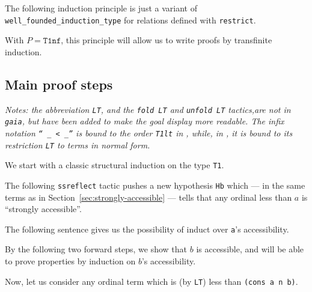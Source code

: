 
The following induction principle is just a variant of \texttt{well\_founded\_induction\_type} for relations defined with \texttt{restrict}.


With $P=\texttt{T1nf}$, this principle will allow us to write proofs by transfinite induction.

\subsection{Main proof steps}

\emph{Notes: the abbreviation \texttt{LT}, and the \texttt{fold LT} and \texttt{unfold LT} tactics,are not in \texttt{gaia}, but  have been added to make the goal display more readable.
The infix notation \texttt{`` \_ < \_''}  is bound to the order \texttt{T1lt} in \gaia, while,  in \Hydras,  it is bound to its restriction \texttt{LT} to terms in normal form. }

We start with a classic structural induction on the type \texttt{T1}.

The following \texttt{ssreflect} tactic  pushes a new hypothesis \texttt{Hb} which --- in the same terms as in Section~\vref{sec:strongly-accessible} --- tells that any ordinal less than $a$ is ``strongly accessible''.


The following sentence gives us the possibility of induct over \texttt{a}'s accessibility.



By the following two forward steps, we show that $b$ is accessible, and will be able to prove properties by induction on $b$'s accessibility.




Now, let us consider any ordinal term which is (by \texttt{LT}) less than \texttt{(cons a n b)}.

